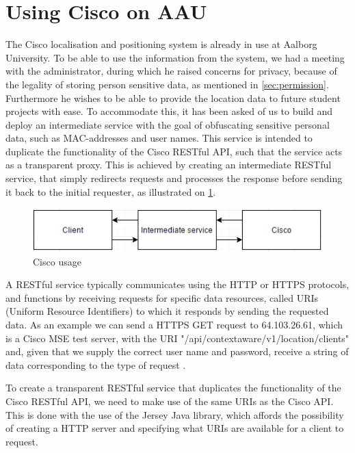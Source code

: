 \section{Using Cisco on AAU}
The Cisco localisation and positioning system is already in use at Aalborg University. To be able to use the information from the system, we had a meeting with the administrator, during which he raised concerns for privacy, because of the legality of storing person sensitive data, as mentioned in \cref{sec:permission}. Furthermore he wishes to be able to provide the location data to future student projects with ease. To accommodate this, it has been asked of us to build and deploy an intermediate service with the goal of obfuscating sensitive personal data, such as MAC-addresses and user names. This service is intended to duplicate the functionality of the Cisco RESTful API, such that the service acts as a transparent proxy. This is achieved by creating an intermediate RESTful service, that simply redirects requests and processes the response before sending it back to the initial requester, as illustrated on \cref{fig:cisco_usage}.

\begin{figure}[ht]
	\begin{center}
	\includegraphics[scale=0.9]{graphics/cisco_usage.png}
	\caption{Cisco usage}
	\label{fig:cisco_usage}
	\end{center} 
\end{figure}

A RESTful service typically communicates using the HTTP or HTTPS protocols, and functions by receiving requests for specific data resources, called URIs (Uniform Resource Identifiers) to which it responds by sending the requested data. As an example we can send a HTTPS GET request to 64.103.26.61, which is a Cisco MSE test server, with the URI "/api/contextaware/v1/location/clients" and, given that we supply the correct user name and password, receive a string of data corresponding to the type of request \cite{restful_oracle}.

To create a transparent RESTful service that duplicates the functionality of the Cisco RESTful API, we need to make use of the same URIs as the Cisco API\cite{cisco_mse_api}. This is done with the use of the Jersey Java library, which affords the possibility of creating a HTTP server and specifying what URIs are available for a client to request.

